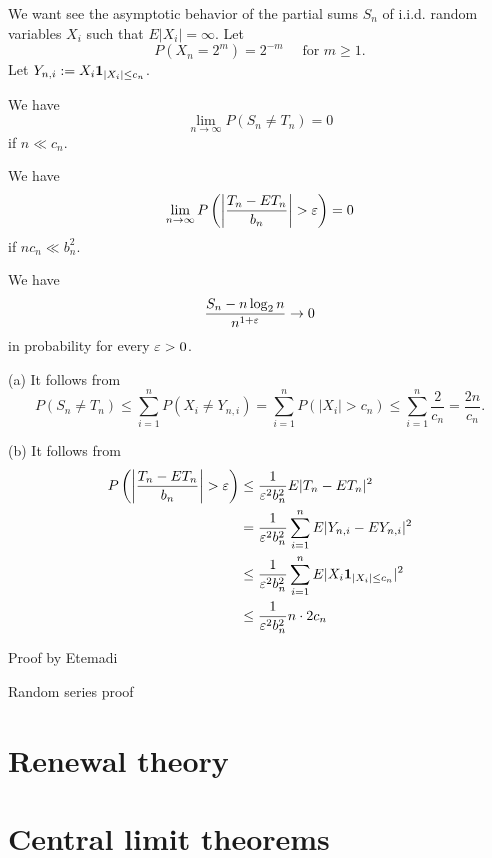 \documentclass{../../large}
\begin{document}
\begin{prb}
We want see the asymptotic behavior of the partial sums $S_n$ of i.i.d. random variables $X_i$ such that $E|X_i|=\infty$.
Let
\[P(X_n=2^m)=2^{-m}\quad\text{ for }m\ge1.\]
Let $Y_{n,i}:=X_i\mathbf{1}_{|X_i|\le c_n}$.
\begin{parts}
\item We have
\[\lim_{n\to\infty}P(S_n\ne T_n)=0\]
if $n\ll c_n$.
\item We have
\[\lim_{n\to\infty}P\left(\left|\frac{T_n-ET_n}{b_n}\right|>\e\right)=0\]
if $nc_n\ll b_n^2$.
\item We have
\[\frac{S_n-n\log_2n}{n^{1+\varepsilon}}\to0\]
in probability for every $\varepsilon>0$.
\end{parts}
\end{prb}
\begin{pf}
(a)
It follows from
\[P(S_n\ne T_n)
\le\sum_{i=1}^nP(X_i\ne Y_{n,i})
=\sum_{i=1}^nP(|X_i|>c_n)
\le\sum_{i=1}^n\frac2{c_n}=\frac{2n}{c_n}.\]

(b)
It follows from
\begin{align*}
P\left(\left|\frac{T_n-ET_n}{b_n}\right|>\e\right)
&\le\frac1{\e^2b_n^2}E|T_n-ET_n|^2\\
&=\frac1{\e^2b_n^2}\sum_{i=1}^nE|Y_{n,i}-EY_{n,i}|^2\\
&\le\frac1{\e^2b_n^2}\sum_{i=1}^nE|X_i\1_{|X_i|\le c_n}|^2\\
&\le\frac1{\e^2b_n^2}n\cdot2c_n
\end{align*}

\end{pf}



\begin{prb}
\end{prb}

\begin{prb}
\end{prb}

\begin{prb}
Proof by Etemadi
\end{prb}

Random series proof

\section{Renewal theory}





\section{Central limit theorems}
\end{document}
